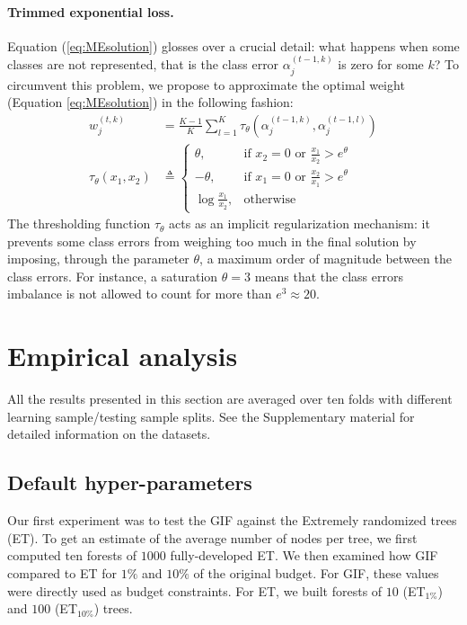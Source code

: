 \documentclass{article}
\begin{document}
\paragraph{Trimmed exponential loss.}
Equation (\ref{eq:MEsolution}) glosses over a crucial detail: what happens when 
some classes are not represented, that is the class error $\alpha_j^{(t-1, k)}$ 
is zero for some $k$? To circumvent this problem, we propose to approximate the 
optimal weight (Equation \ref{eq:MEsolution}) in the following fashion:
\begin{align}\label{eq:METrimmed}
w_j^{(t,k)} &= \frac{K-1}{K} \sum_{l=1}^{K} \tau_{\theta} \left(\alpha_j^{(t-1, 
k)},  \alpha_j^{(t-1, l)}\right)\\
\tau_{\theta}(x_1, x_2) &\triangleq \begin{cases}
    \theta, & \text{if $x_2 = 0$ or $\frac{x_1}{x_2} > e^{\theta}$}\\
    -\theta,& \text{if $x_1 = 0$ or $\frac{x_2}{x_1} > e^{\theta}$}\\
    \log \frac{x_1}{x_2}, & \text{otherwise}
  \end{cases}
\end{align}
The thresholding function $\tau_{\theta}$ acts as an implicit regularization 
mechanism: it prevents some class errors from weighing too much in the final 
solution by imposing, through the parameter $\theta$, a maximum order of magnitude between the class errors. %
For instance, a saturation $\theta=3$ means that the class errors imbalance is 
not allowed to count for more than $e^3 \approx 20$. 




\section{Empirical analysis}
\label{sec:analysis}

All the results presented in this section are averaged over ten folds
with different learning sample/testing sample splits. See the Supplementary 
material for detailed information on the datasets.

\subsection{Default hyper-parameters}
\label{subsec:defaultHP}

Our first experiment was to test the GIF against the Extremely randomized trees 
(ET).
To get an estimate of the average number of nodes per tree, we first 
computed ten forests of $1000$ fully-developed ET. We then examined how GIF 
compared to ET for $1\%$ and $10\%$ of the original budget. For GIF, these 
values were directly used as budget constraints. For ET, we built forests of 
$10$ (ET$_{1\%}$) and $100$ (ET$_{10\%}$) trees. 
\end{document}

